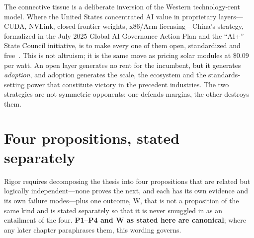 The connective tissue is a deliberate inversion of the Western technology-rent model. Where the United States concentrated AI value in proprietary layers---CUDA, NVLink, closed frontier weights, x86/Arm licensing---China's strategy, formalized in the July 2025 Global AI Governance Action Plan and the ``AI+'' State Council initiative, is to make every one of them open, standardized and free~\cite{action-plan,ai-plus}. This is not altruism; it is the same move as pricing solar modules at \$0.09 per watt. An open layer generates no rent for the incumbent, but it generates \emph{adoption}, and adoption generates the scale, the ecosystem and the standards-setting power that constitute victory in the precedent industries. The two strategies are not symmetric opponents: one defends margins, the other destroys them.

\section{Four propositions, stated separately}
\label{c:propositions}

Rigor requires decomposing the thesis into four propositions that are related but logically independent---none proves the next, and each has its own evidence and its own failure modes---plus one outcome, W, that is not a proposition of the same kind and is stated separately so that it is never smuggled in as an entailment of the four. \textbf{P1--P4 and W as stated here are canonical}; where any later chapter paraphrases them, this wording governs.


